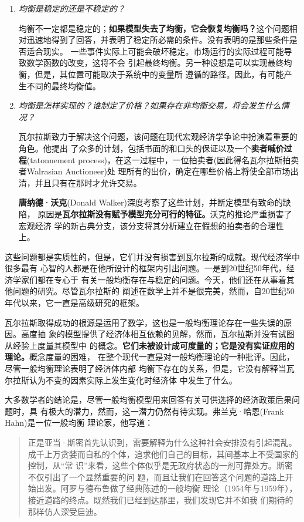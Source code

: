 \begin{enumerate}
\item \textit{均衡是稳定的还是不稳定的？}

  均衡不一定都是稳定的；\textbf{如果模型失去了均衡，它会恢复均衡吗？}这个问题相
对迅速地得到了回答，并表明了稳定所必需的条件。没有表明的是那些条件是否适合现实。
一些事件实际上可能会破坏稳定。市场运行的实际过程可能导致数学函数的改变，这将不会
引起最终均衡。另一种设想是可以实现最终均衡，但是，其位置可能取决于系统中的变量所
遵循的路径。因此，有可能产生不同的最终均衡值。

\item \textit{均衡是怎样实现的？谁制定了价格？如果存在非均衡交易，将会发生什么情
况？}

瓦尔拉斯致力于解决这个问题，该问题在现代宏观经济学争论中扮演着重要的角色。他提出
了众多的计划，包括书面的和口头的保证以及一个\textbf{卖者喊价过程}(tatonnement
process)，在这一过程中，一位拍卖者(因此得名瓦尔拉斯拍卖者Walrasian Auctioneer)处
理所有的出价，确定在哪些价格上将使全部市场出清，并且只有在那时才允许交易。

\textbf{唐纳德·沃克}(Donald Walker)深度考察了这些计划，并断定模型有致命的缺陷，
原因是\textbf{瓦尔拉斯没有赋予模型充分可行的特征。}沃克的推论严重损害了宏观经济
学的新古典分支，该分支将其分析建立在假想的拍卖者的合理性上。

\end{enumerate}

这些问题都是实质性的，但是，它们并没有损害到瓦尔拉斯的成就。现代经济学中很多最有
心智的人都是在他所设计的框架内引出问题。一是到20世纪50年代，经济学家们都在专心于
有关一般均衡存在与稳定的问题。今天，他们还在从事着其他问题的研究。尽管瓦尔拉斯的
阐述在数学上并不是很完美，然而，自20世纪50年代以来，它一直是高级研究的框架。

瓦尔拉斯取得成功的根源是运用了数学，这也是一般均衡理论存在一些失误的原因。高度抽
象的模型提供了经济体相互依赖的见解，然而，瓦尔拉斯并没有试图从经验上度量其模型中
的概念。\textbf{它们未被设计成可度量的；它是没有实证应用的理论。}概念度量的困难，
在整个现代一直是对一般均衡理论的一种批评。因此，尽管一般均衡理论表明了经济体内部
均衡下存在的关系，但是，它没有解释当瓦尔拉斯认为不变的因素实际上发生变化时经济体
中发生了什么。

大多数学者的结论是，尽管一般均衡模型用来回答有关可供选择的经济政策后果问题时，具
有极大的潜力，然而，这一潜力仍然有待实现。弗兰克·哈恩(Frank Hahn)是一位一般均衡
理论家，他写道：

\begin{quotation}正是亚当·斯密首先认识到，需要解释为什么这种社会安排没有引起混乱。
成千上万贪婪而自私的个体，追求他们自己的目标，其间基本上不受国家的控制，从“常
识”来看，这些个体似乎是无政府状态的一剂可靠处方。斯密不仅引出了一个显然重要的问
题，而且让我们在回答这个问题的道路上开始出发。阿罗与德布鲁做了经典陈述的一般均衡
理论（1954年与1959年），接近道路的终点。既然我们已经到达那里，我们发现它并不如我
们期待的那样仿人深受启迪。
\end{quotation}


